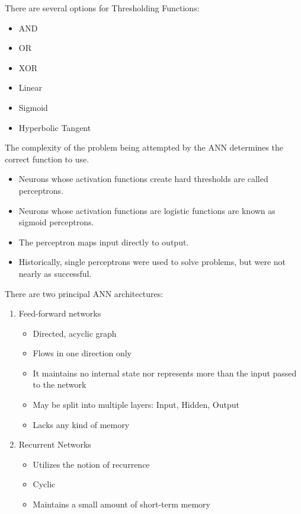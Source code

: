 \documentclass[8pt]{beamer}
\begin{document}
\begin{frame}

There are several options for Thresholding Functions:

\begin{itemize}
\item AND
\item OR
\item XOR
\item Linear
\item Sigmoid
\item Hyperbolic Tangent 
\end{itemize}

The complexity of the problem being attempted by the ANN determines the correct function to use.

\end{frame}

\begin{frame}
\begin{itemize}
\item Neurons whose activation functions create hard thresholds are called perceptrons.  
\item Neurons whose activation functions are logistic functions are known as sigmoid perceptrons.
\item The perceptron maps input directly to output.
\item Historically, single perceptrons were used to solve problems, but were not nearly as successful.
\end{itemize}
\end{frame}

\begin{frame}
There are two principal ANN architectures:
\begin{enumerate}
\item Feed-forward networks
\begin{itemize}
\item Directed, acyclic graph
\item Flows in one direction only
\item It maintains no internal state nor represents more than the input passed to the network
\item May be split into multiple layers: Input, Hidden, Output
\item Lacks any kind of memory
\end{itemize}
\item Recurrent Networks
\begin{itemize}
\item Utilizes the notion of recurrence 
\item Cyclic
\item Maintains a small amount of short-term memory
\end{itemize}
\end{enumerate}

\end{frame}
\end{document}
